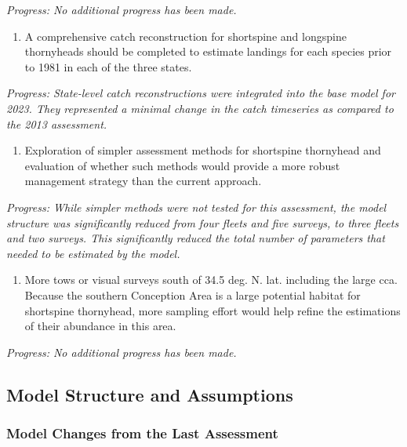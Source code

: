\documentclass[11pt,
  english,
  letterpaper,
]{article}
\providecommand{\tightlist}{%
  \setlength{\itemsep}{0pt}\setlength{\parskip}{0pt}}
\providecommand{\tightlist}{%
  \setlength{\itemsep}{0pt}\setlength{\parskip}{0pt}}
\begin{document}
\emph{Progress: No additional progress has been made.}

\begin{enumerate}
\def\labelenumi{\arabic{enumi}.}
\setcounter{enumi}{5}
\tightlist
\item
  A comprehensive catch reconstruction for shortspine and longspine thornyheads should be completed to estimate landings for each species prior to 1981 in each of the three states.
\end{enumerate}

\emph{Progress: State-level catch reconstructions were integrated into the base model for 2023. They represented a minimal change in the catch timeseries as compared to the 2013 assessment.}

\begin{enumerate}
\def\labelenumi{\arabic{enumi}.}
\setcounter{enumi}{6}
\tightlist
\item
  Exploration of simpler assessment methods for shortspine thornyhead and evaluation of whether such methods would provide a more robust management strategy than the current approach.
\end{enumerate}

\emph{Progress: While simpler methods were not tested for this assessment, the model structure was significantly reduced from four fleets and five surveys, to three fleets and two surveys. This significantly reduced the total number of parameters that needed to be estimated by the model.}

\begin{enumerate}
\def\labelenumi{\arabic{enumi}.}
\setcounter{enumi}{7}
\tightlist
\item
  More tows or visual surveys south of 34.5 deg. N. lat. including the large \gls{cca}. Because the southern Conception Area is a large potential habitat for shortspine thornyhead, more sampling effort would help refine the estimations of their abundance in this area.
\end{enumerate}

\emph{Progress: No additional progress has been made.}

\hypertarget{model-structure-and-assumptions}{%
\subsection{Model Structure and Assumptions}\label{model-structure-and-assumptions}}

\hypertarget{model-changes-from-the-last-assessment}{%
\subsubsection{Model Changes from the Last Assessment}\label{model-changes-from-the-last-assessment}}
\end{document}
